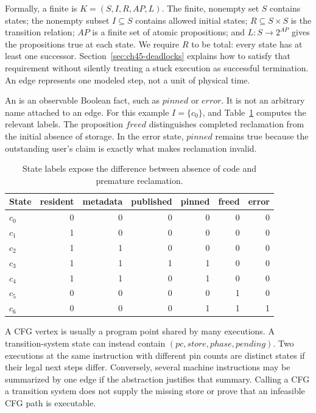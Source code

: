 Formally, a finite  is $K=(S,I,R,AP,L)$.
The finite, nonempty set $S$ contains states; the nonempty subset $I\subseteq S$ contains allowed initial states; $R\subseteq S\times S$ is the transition relation; $AP$ is a finite set of atomic propositions; and $L:S\to 2^{AP}$ gives the propositions true at each state.
We require $R$ to be total: every state has at least one successor.
Section~\ref{sec:ch45-deadlocks} explains how to satisfy that requirement without silently treating a stuck execution as successful termination.
An edge represents one modeled step, not a unit of physical time.

An  is an observable Boolean fact, such as $\mathit{pinned}$ or $\mathit{error}$.
It is not an arbitrary name attached to an edge.
For this example $I=\{c_0\}$, and Table~\ref{tab:ch45-cache-labels} computes the relevant labels.
The proposition $\mathit{freed}$ distinguishes completed reclamation from the initial absence of storage.
In the error state, $\mathit{pinned}$ remains true because the outstanding user's claim is exactly what makes reclamation invalid.

\begin{table}[tbp]
\centering
\caption{State labels expose the difference between absence of code and premature reclamation.}
\label{tab:ch45-cache-labels}
\begin{tabular}{lrrrrrr}
\toprule
State & resident & metadata & published & pinned & freed & error \\
\midrule
$c_0$ & 0 & 0 & 0 & 0 & 0 & 0 \\
$c_1$ & 1 & 0 & 0 & 0 & 0 & 0 \\
$c_2$ & 1 & 1 & 0 & 0 & 0 & 0 \\
$c_3$ & 1 & 1 & 1 & 1 & 0 & 0 \\
$c_4$ & 1 & 1 & 0 & 1 & 0 & 0 \\
$c_5$ & 0 & 0 & 0 & 0 & 1 & 0 \\
$c_6$ & 0 & 0 & 0 & 1 & 1 & 1 \\
\bottomrule
\end{tabular}
\end{table}

A CFG vertex is usually a program point shared by many executions.
A transition-system state can instead contain $(\mathit{pc},\mathit{store},\mathit{phase},\mathit{pending})$.
Two executions at the same instruction with different pin counts are distinct states if their legal next steps differ.
Conversely, several machine instructions may be summarized by one edge if the abstraction justifies that summary.
Calling a CFG a transition system does not supply the missing store or prove that an infeasible CFG path is executable.

